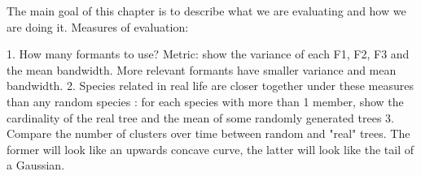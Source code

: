 \documentclass[../main.tex]{subfiles}
\begin{document}
The main goal of this chapter is to describe what we are evaluating and how we are doing it. Measures of evaluation:

1. How many formants to use? Metric: show the variance of each F1, F2, F3 and the mean bandwidth. More relevant formants have smaller variance and mean bandwidth.
2. Species related in real life are closer together under these measures than any random species : for each species with more than 1 member, show the cardinality of the real tree and the mean of some randomly generated trees
3. Compare the number of clusters over time between random and "real" trees. The former will look like an upwards concave curve, the latter will look like the tail of a Gaussian.
\end{document}
